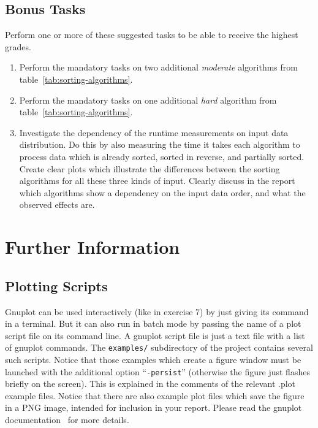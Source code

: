 \documentclass[a4paper,10pt]{article}
\begin{document}
\subsection*{Bonus Tasks}

Perform one or more of these suggested tasks to be able to receive the highest grades.

\begin{enumerate}
  
\item
  Perform the mandatory tasks on two additional \emph{moderate} algorithms from table~\ref{tab:sorting-algorithms}.
  
\item
  Perform the mandatory tasks on one additional \emph{hard} algorithm from table~\ref{tab:sorting-algorithms}.
  
\item
  Investigate the dependency of the runtime measurements on input data distribution.
  Do this by also measuring the time it takes each algorithm to process data which is already sorted, sorted in reverse, and partially sorted.
  Create clear plots which illustrate the differences between the sorting algorithms for all these three kinds of input.
  Clearly discuss in the report which algorithms show a dependency on the input data order, and what the observed effects are.
  
\end{enumerate}



\section*{Further Information}



\subsection*{Plotting Scripts}

Gnuplot can be used interactively (like in exercise 7) by just giving its command in a terminal.
But it can also run in batch mode by passing the name of a plot script file on its command line.
A gnuplot script file is just a text file with a list of gnuplot commands.
The \texttt{examples/} subdirectory of the project contains several such scripts.
Notice that those examples which create a figure window must be launched with the additional option ``\texttt{-persist}'' (otherwise the figure just flashes briefly on the screen).
This is explained in the comments of the relevant .plot example files.
Notice that there are also example plot files which save the figure in a PNG image, intended for inclusion in your report.
Please read the gnuplot documentation~\cite{gnuplot} for more details.
\end{document}
